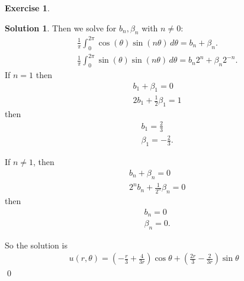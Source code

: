 \documentclass{book}
\theoremstyle{definition}
\newtheorem*{exer*}{Exercise}
\newtheorem*{sln*}{Solution}
\newcommand{\f}[2]{\frac{#1}{#2}}
\newcommand{\lp}{\left(}
\newcommand{\rp}{\right)}
\begin{document}
\begin{exer*}
\begin{sln*}
		
		
		Then we solve for $b_n, \beta_n$ with $n\neq 0$:
		\begin{align*}
		&\f{1}{\pi}\int^{2\pi}_0 \cos(\theta)\sin(n\theta)\,d\theta = b_n + \beta_n.\\
		&\f{1}{\pi}\int^{2\pi}_0 \sin(\theta)\sin(n\theta)\,d\theta = b_n 2^n + \beta_n 2^{-n}.
		\end{align*}
		If $n=1$ then
		\begin{align*}
		& b_1 + \beta_1 = 0\\
		& 2b_1 + \frac{1}{2}\beta_1 = 1
		\end{align*}
		then
		\begin{align*}
		&b_1 = \frac{2}{3}\\
		&\beta_1 = -\frac{2}{3}.
		\end{align*}
		
		If $n\neq 1$, then
		\begin{align*}
		& b_n + \beta_n = 0\\
		& 2^n b_n + \frac{1}{2^n}\beta_n = 0
		\end{align*}
		then 
		\begin{align*}
		&b_n = 0\\
		&\beta_n = 0.
		\end{align*}
		
		So the solution is
		\begin{align*}
		\boxed{u(r,\theta) = \lp -\f{r}{3} + \f{4}{3r} \rp\cos\theta + \lp \f{2r}{3} - \f{2}{3r} \rp\sin\theta }
		\end{align*}\qed
	\end{sln*}
\end{exer*}
\newpage
\end{document}
